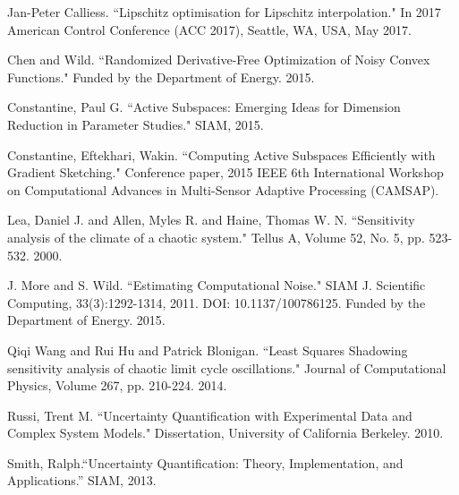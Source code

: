 \documentclass{amsart}
\begin{document}
\begin{thebibliography}{65}


 Jan-Peter Calliess. ``Lipschitz optimisation for Lipschitz interpolation." In 2017 American Control Conference (ACC 2017), Seattle, WA, USA, May 2017.

 Chen and Wild. ``Randomized Derivative-Free Optimization of Noisy Convex Functions." Funded by the Department of Energy. 2015.

 Constantine, Paul G. ``Active Subspaces: Emerging Ideas for Dimension Reduction in Parameter Studies." SIAM, 2015.

 Constantine, Eftekhari, Wakin. ``Computing Active Subspaces Efficiently with Gradient Sketching." Conference paper, 2015 IEEE 6th International Workshop on Computational Advances in Multi-Sensor Adaptive Processing (CAMSAP).


 Lea, Daniel J. and Allen, Myles R. and Haine, Thomas W. N. ``Sensitivity analysis of the climate of a chaotic system." Tellus A, Volume 52, No. 5, pp. 523-532. 2000.

 J. More and S. Wild. ``Estimating Computational Noise." SIAM J. Scientific Computing, 33(3):1292-1314, 2011. DOI: 10.1137/100786125. Funded by the Department of Energy. 2015.


 Qiqi Wang and Rui Hu and Patrick Blonigan. ``Least Squares Shadowing sensitivity analysis of chaotic limit cycle oscillations." Journal of Computational Physics, Volume 267, pp. 210-224. 2014.

 Russi, Trent M. ``Uncertainty Quantification with Experimental Data and Complex System Models." Dissertation, University of California Berkeley. 2010.

  Smith, Ralph.``Uncertainty Quantification: Theory, Implementation, and Applications.” SIAM, 2013.




\end{thebibliography}
\end{document}
